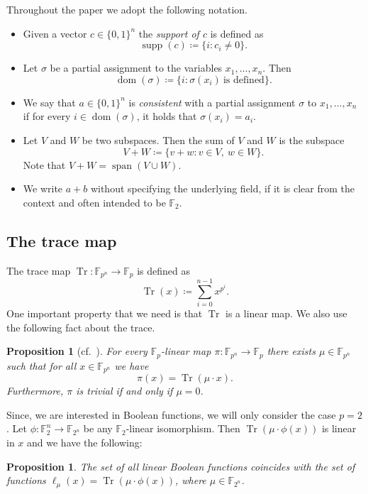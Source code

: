 \documentclass[10pt,a4paper]{article}
\newtheorem{proposition}[theorem]{Proposition}
\theoremstyle{definition}
\theoremstyle{remark}
\DeclareMathOperator{\supp}{supp}
\DeclareMathOperator{\dom}{dom}
\DeclareMathOperator{\Span}{span}
\DeclareMathOperator{\Tr}{Tr}
\newcommand{\Q}{{\{0,1\}}}
\newcommand{\bbF}{\mathbb{F}}
\begin{document}
Throughout the paper we adopt the following notation.
\begin{itemize}
  \item Given a vector $c \in \Q^n$ the \emph{support of $c$} is defined as
  \[
    \supp(c) \coloneqq \{i : c_i \neq 0\}.
  \]

  \item Let $\sigma$ be a partial assignment to the variables $x_1, \ldots, x_n$. Then
  \[
    \dom(\sigma) \coloneqq \{i : \sigma(x_i)\ \text{is defined}\}.
  \]

  \item We say that $a \in \Q^n$ is \emph{consistent} with a partial assignment $\sigma$ to $x_1, \ldots, x_n$ if for every $i \in \dom(\sigma)$, it holds that $\sigma(x_i) = a_i$.
  
  \item Let $V$ and $W$ be two subspaces. Then the sum of $V$ and $W$ is the subspace
  \[
    V+W \coloneqq \{v+w : v \in V,\ w \in W\}.
  \]
  Note that $V + W = \Span(V \cup W)$.

  \item We write $a+b$ without specifying the underlying field, if it is clear from the context and often intended to be $\bbF_2$.
\end{itemize}

\subsection{The trace map}

The trace map $\Tr\colon \bbF_{p^n} \to \bbF_p$ is defined as
\[
  \Tr(x) \coloneqq \sum_{i=0}^{n-1} x^{p^i}.
\]
One important property that we need is that $\Tr$ is a linear map. We also use the following fact about the trace.
\begin{proposition}[cf.~\cite{lidl_niederreiter_1996}]\label{prop:trace_linear}
  For every $\bbF_p$-linear map $\pi\colon \bbF_{p^n} \to \bbF_p$ there exists $\mu \in \bbF_{p^n}$ such that for all $x \in \bbF_{p^n}$ we have
  \[
    \pi(x) = \Tr(\mu \cdot x).
  \]
  Furthermore, $\pi$ is trivial if and only if $\mu = 0$.
\end{proposition}

Since, we are interested in Boolean functions, we will only consider the case $p=2$.
Let $\phi\colon \bbF_2^n \to \bbF_{2^n}$ be any $\bbF_2$-linear isomorphism. Then $\Tr(\mu \cdot \phi(x))$ is linear in $x$ and we have the following:
\begin{proposition}\label{prop:trace_linear_boolean}
  The set of all linear Boolean functions coincides with the set of functions $\ell_\mu(x) = \Tr(\mu \cdot \phi(x))$, where $\mu \in \bbF_{2^n}$.
\end{proposition}
\end{document}
